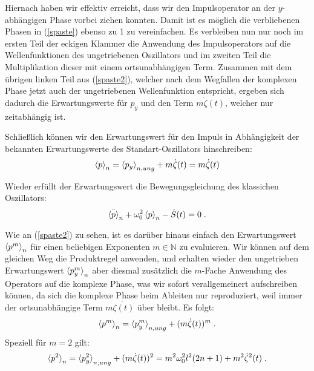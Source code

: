     Hiernach haben wir effektiv erreicht, dass wir den Impulsoperator an der $y$-abhängigen Phase vorbei ziehen konnten.
    Damit ist es möglich die verbliebenen Phasen in (\ref{spaste}) ebenso zu 1 zu vereinfachen.
    Es verbleiben nun nur noch im ersten Teil der eckigen Klammer die Anwendung des Impulsoperators auf die Wellenfunktionen des ungetriebenen Oszillators und im zweiten Teil die Multiplikation dieser mit einem ortsunabhängigen Term.
    Zusammen mit dem übrigen linken Teil aus (\ref{spaste2}), welcher nach dem Wegfallen der komplexen Phase jetzt auch der ungetriebenen Wellenfunktion entspricht, ergeben sich dadurch die Erwartungswerte für $p_y$ und den Term $m\dot{\zeta}(t)$, welcher nur zeitabhängig ist.

    Schließlich können wir den Erwartungswert für den Impuls in Abhängigkeit der bekannten Erwartungswerte des Standart-Oszillators hinschreiben:
    \begin{align}
      \braket{p}_n = \braket{p_y}_{n,ung} + m\dot{\zeta}(t) = m\dot{\zeta}(t)
    \end{align}

    Wieder erfüllt der Erwartungswert die Bewegungsgleichung des klassichen Oszillators:
    \begin{equation}
      \ddot{\braket{p}}_n + \omega_0^2\braket{p}_n - \dot{S}(t) = 0 \; .
    \end{equation}

    Wie an (\ref{spaste2}) zu sehen, ist es darüber hinaus einfach den Erwartungswert $\braket{p^m}_n$ für einen beliebigen Exponenten $m \in \mathbb{N}$ zu evaluieren.
    Wir können auf dem gleichen Weg die Produktregel anwenden, und erhalten wieder den ungetrieben Erwartungswert $\braket{p^m_y}_n$ aber diesmal zusätzlich die $m$-Fache Anwendung des Operators auf die komplexe Phase, was wir sofort verallgemeinert aufschreiben können, da sich die komplexe Phase beim Ableiten nur reproduziert, weil immer der ortsunabhängige Term $m\dot{\zeta(t)}$ über bleibt.
    Es folgt:
    \begin{equation}
      \braket{p^m}_n = \braket{p^m_y}_{n,ung} + (m\dot{\zeta}(t))^m \; .
    \end{equation}
    Speziell für $m=2$ gilt:
    \begin{equation}
      \braket{p^2}_n = \braket{p^2_y}_{n,ung} + (m\dot{\zeta}(t))^2 = m^2\omega^2_0 l^2(2n+1) + m^2\dot{\zeta}^2(t) \; .
    \end{equation}


